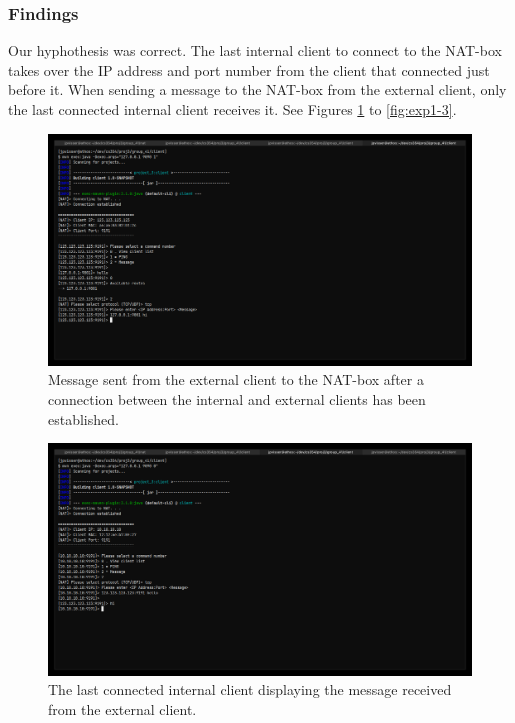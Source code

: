\documentclass[10pt, a4paper]{article}
\begin{document}
\subsubsection{Findings}
\label{sssec:dupfind}

Our hyphothesis was correct. The last internal client to connect to the NAT-box
takes over the IP address and port number from the client that connected just
before it. When sending a message to the NAT-box from the external client, only
the last connected internal client receives it. See Figures \ref{fig:exp1-1} to
\ref{fig:exp1-3}.

\begin{figure}
  \centering
  \includegraphics[width=12cm]{exp1-1}
  \caption{Message sent from the external client to the NAT-box after a
  connection between the internal and external clients has been established.}
  \label{fig:exp1-1}
\end{figure}

\begin{figure}
  \centering
  \includegraphics[width=12cm]{exp1-2}
  \caption{The last connected internal client displaying the message received
  from the external client.}
  \label{fig:exp1-2}
\end{figure}
\end{document}
